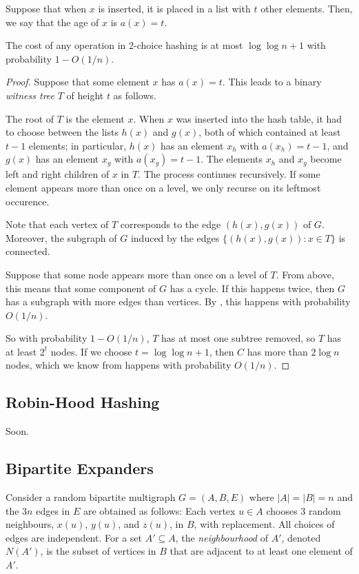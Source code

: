 \documentclass{patmorin}
\begin{document}
Suppose that when $x$ is inserted, it is placed in a list with $t$
other elements. Then, we say that the age of $x$ is $a(x) = t$.
\begin{thm}
  The cost of any operation in 2-choice hashing is at most
  $\log \log n + 1$ with probability $1 - O(1/n)$.
\end{thm}
\begin{proof}
  Suppose that some element $x$ has $a(x) = t$. This leads to a binary
  \emph{witness tree} $T$ of height $t$ as follows.

  The root of $T$ is the element $x$. When $x$ was inserted into the
  hash table, it had to choose between the lists $h(x)$ and $g(x)$,
  both of which contained at least $t - 1$ elements; in particular,
  $h(x)$ has an element $x_h$ with $a(x_h) = t - 1$, and $g(x)$ has an
  element $x_g$ with $a(x_g) = t - 1$. The elements $x_h$ and $x_g$
  become left and right children of $x$ in $T$. The process continues
  recursively. If some element appears more than once on a level, we
  only recurse on its leftmost occurence.

  Note that each vertex of $T$ corresponds to the edge $(h(x), g(x))$
  of $G$. Moreover, the subgraph of $G$ induced by the edges
  $\{(h(x), g(x)) : x \in T\}$ is connected.

  Suppose that some node appears more than once on a level of
  $T$. From above, this means that some component of $G$ has a
  cycle. If this happens twice, then $G$ has a subgraph with more
  edges than vertices. By , this happens
  with probability $O(1/n)$.

  So with probability $1 - O(1/n)$, $T$ has at most one subtree
  removed, so $T$ has at least $2^t$ nodes. If we choose
  $t = \log \log n + 1$, then $C$ has more than $2 \log n$ nodes,
  which we know from  happens with
  probability $O(1/n)$.
\end{proof}

\subsection{Robin-Hood Hashing}

Soon.


\subsection{Bipartite Expanders}

Consider a random bipartite multigraph $G=(A,B,E)$ where $|A|=|B|=n$
and the $3n$ edges in $E$ are obtained as follows:  Each vertex $u\in A$
chooses 3 random neighbours, $x(u)$, $y(u)$, and $z(u)$, in $B$, with
replacement.  All choices of edges are independent. For a set $A'\subseteq
A$, the \emph{neighbourhood} of $A'$, denoted $N(A')$, is the subset of
vertices in $B$ that are adjacent to at least one element of $A'$.
\end{document}
